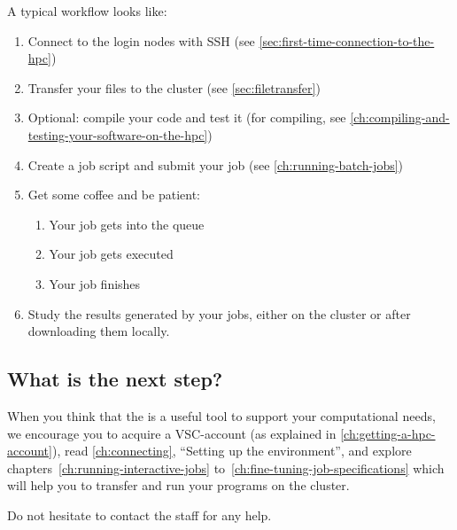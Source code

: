 A typical workflow looks like:

\begin{enumerate}
    \item Connect to the login nodes with SSH (see \autoref{sec:first-time-connection-to-the-hpc})
    \item Transfer your files to the cluster (see \autoref{sec:filetransfer})
    \item Optional: compile your code and test it (for compiling, see \autoref{ch:compiling-and-testing-your-software-on-the-hpc})
    \item Create a job script and submit your job (see \autoref{ch:running-batch-jobs})
    \item Get some coffee and be patient:
    \begin{enumerate}
        \item Your job gets into the queue
        \item Your job gets executed
        \item Your job finishes
    \end{enumerate}
    \item Study the results generated by your jobs, either on the cluster or after downloading them locally.
\end{enumerate}


\subsection{What is the next step?}
\label{sec:what-is-the-next-step}

When you think that the \hpc is a useful tool to support your computational
needs, we encourage you to acquire a VSC-account (as explained in
\autoref{ch:getting-a-hpc-account}), read
\autoref{ch:connecting}, ``Setting up the environment'', and
explore chapters~\ref{ch:running-interactive-jobs}
to~\ref{ch:fine-tuning-job-specifications} which will help you to transfer and
run your programs on the \hpc cluster.

Do not hesitate to contact the \hpc staff for any help.
